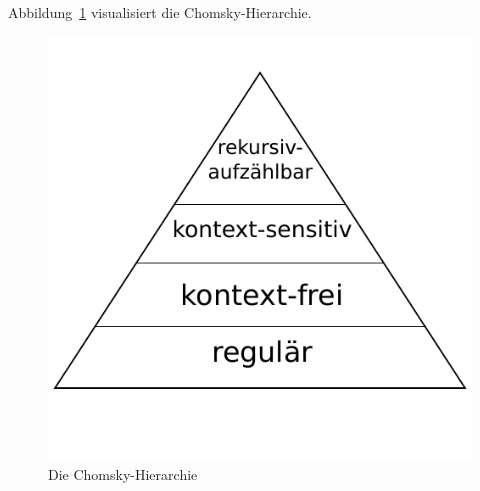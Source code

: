 Abbildung~\ref{fig:chomsky_hierarchy} visualisiert die Chomsky-Hierarchie.
%
\begin{figure}[ht]
 \begin{center}
  \includegraphics{img/chomsky_hierarchy.pdf}
  \caption{Die Chomsky-Hierarchie}
  \label{fig:chomsky_hierarchy}
 \end{center}
\end{figure}
